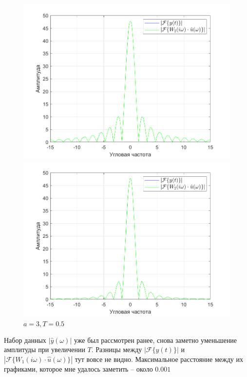 \documentclass[a4paper]{article}
\begin{document}
\begin{figure}[H]
    \begin{minipage}{0.5\textwidth}
        \centering
        \includegraphics[width=\linewidth]{ex1_1/a=3_T=0.1/h4.png}
        \caption{$a = 3, T = 0.1$}
    \end{minipage}
    \begin{minipage}{0.5\textwidth}
        \centering
        \includegraphics[width=\linewidth]{ex1_1/a=3_T=0.5/h4.png}
        \caption{$a = 3, T = 0.5$}
    \end{minipage}
\end{figure}

Набор данных $|\hat{y}(\omega)|$ уже был рассмотрен ранее, снова заметно уменьшение амплитуды при увеличении $T$. Разницы между $\left|\mathcal{F}\{y(t)\}\right|$ и $\left|\mathcal{F}\{W_1(i\omega) \cdot \hat{u}(\omega)\}\right|$ тут вовсе не видно. Максимальное расстояние между их графиками, которое мне удалось заметить -- около $0.001$\ 
\end{document}
